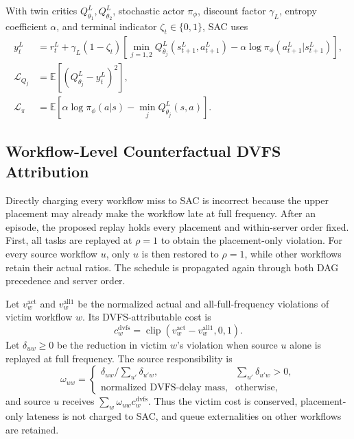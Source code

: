 \documentclass[lettersize,journal]{IEEEtran}
\newcommand{\clip}{\operatorname{clip}}
\begin{document}
With twin critics $Q_{\theta_1}^L,Q_{\theta_2}^L$, stochastic actor $\pi_\phi$,
discount factor $\gamma_L$, entropy coefficient $\alpha$, and terminal indicator
$\zeta_t\in\{0,1\}$, SAC uses
\begin{align}
 y_t^L&=r_t^L+\gamma_L(1-\zeta_t)
 \left[\min_{j=1,2}Q_{\bar\theta_j}^L(s_{t+1}^L,a_{t+1}^L)
 -\alpha\log\pi_\phi(a_{t+1}^L|s_{t+1}^L)\right],\\
 \mathcal{L}_{Q_j}&=\mathbb{E}[(Q_{\theta_j}^L-y_t^L)^2],\\
 \mathcal{L}_{\pi}&=\mathbb{E}\left[\alpha\log\pi_\phi(a|s)
 -\min_j Q_{\theta_j}^L(s,a)\right].
 \label{eq:sac_losses}
\end{align}

\subsection{Workflow-Level Counterfactual DVFS Attribution}
Directly charging every workflow miss to SAC is incorrect because the upper
placement may already make the workflow late at full frequency. After an
episode, the proposed replay holds every placement and within-server order
fixed. First, all tasks are replayed at $\rho=1$ to obtain the placement-only
violation. For every source workflow $u$, only $u$ is then restored to
$\rho=1$, while other workflows retain their actual ratios. The schedule is
propagated again through both DAG precedence and server order.

Let $v_w^{\mathrm{act}}$ and $v_w^{\mathrm{all1}}$ be the normalized actual and
all-full-frequency violations of victim workflow $w$. Its DVFS-attributable
cost is
\begin{equation}
 c_w^{\mathrm{dvfs}}=\clip(v_w^{\mathrm{act}}-v_w^{\mathrm{all1}},0,1).
 \label{eq:dvfs_victim_cost}
\end{equation}
Let $\delta_{uw}\ge0$ be the reduction in victim $w$'s violation when source
$u$ alone is replayed at full frequency. The source responsibility is
\begin{equation}
 \omega_{uw}=
 \begin{cases}
 \delta_{uw}/\sum_{u'}\delta_{u'w},&\sum_{u'}\delta_{u'w}>0,\\
 \text{normalized DVFS-delay mass},&\text{otherwise},
 \end{cases}
 \label{eq:responsibility}
\end{equation}
and source $u$ receives $\sum_w\omega_{uw}c_w^{\mathrm{dvfs}}$. Thus the
victim cost is conserved, placement-only lateness is not charged to SAC, and
queue externalities on other workflows are retained.
\end{document}
